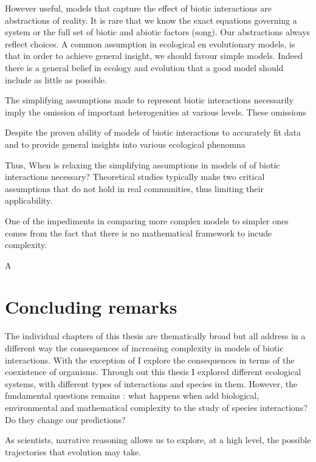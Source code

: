 \documentclass[12pt]{article}
\begin{document}
However useful, models that capture the effect of biotic interactions are abstractions of reality. It is rare that we know the exact equations governing a system or the full set of biotic and abiotic factors (song). Our abstractions always reflect choices.  A common assumption in ecological en evolutionary models, is that in order to achieve general insight, we should favour simple models. Indeed there is a general belief in ecology and evolution that a good model should include as little as possible.


The simplifying assumptions made to represent biotic interactions necessarily imply the omission of important heterogenities at various levels. These omissions

Despite the proven ability of models of biotic interactions to accurately fit data and to provide general insights into various ecological phenomna

Thus, When is relaxing the simplifying assumptions in models of  of biotic interactions necessary? Theoretical studies typically make two critical assumptions that do not hold in real communities, thus limiting their applicability.


One of the impediments in comparing more complex models to simpler ones comes from the fact that there is no mathematical framework to incude complexity.


A




\section*{Concluding remarks}
The individual chapters of this thesis are thematically broad but all address in a different way the consequences of increasing complexity in models of biotic interactions. With the exception of  I explore the consequences in terms of the coexistence of organisms. Through out this thesis I explored different ecological systems, with different types of interactions and species in them. However, the fundamental questions remains : what happens when add biological, environmental and mathematical complexity to the study of species interactions? Do they change our predictions?

 As scientists, narrative reasoning allows us to explore, at a high level, the possible trajectories that evolution may take.



\clearpage


\end{document}

